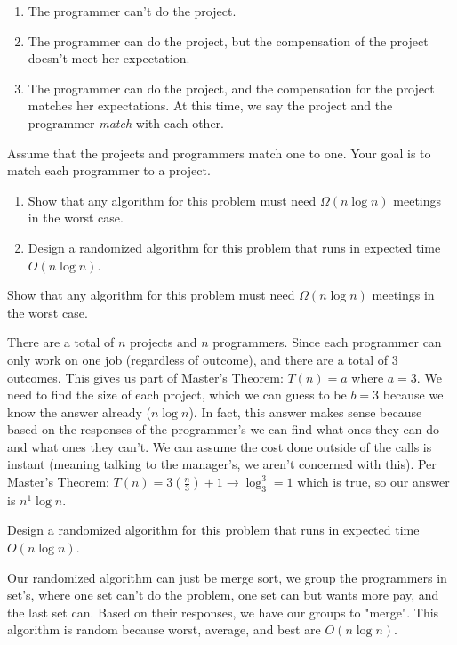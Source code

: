 \documentclass[11pt]{article}
\begin{document}
\begin{enumerate}
  \item The programmer can't do the project.
  \item The programmer can do the project, but the compensation of the
    project doesn't meet her expectation.
  \item The programmer can do the project, and the compensation for
    the project matches her expectations. At this time, we say the
    project and the programmer \textit{match} with each other.
\end{enumerate}

Assume that the projects and programmers match one to one. Your goal
is to match each programmer to a project.

\begin{enumerate}[label=\Alph*.]
\item Show that any algorithm for this problem must need $\Omega( n
\log{n} )$ meetings in the worst case.

\item  Design a randomized algorithm for this problem that runs in
expected time $O ( n \log{n} )$.
\end{enumerate}

Show that any algorithm for this problem must need $\Omega( n
\log{n} )$ meetings in the worst case.

There are a total of $n$ projects and $n$ programmers. Since each programmer can only work on one job (regardless of outcome), and there are a total of $3$ outcomes. This gives us part of Master's Theorem: $T(n) = a$ where $a = 3$. We need to find the size of each project, which we can guess to be $b = 3$ because we know the answer already ($n \log n$). In fact, this answer makes sense because based on the responses of the programmer's we can find what ones they can do and what ones they can't. We can assume the cost done outside of the calls is instant (meaning talking to the manager's, we aren't concerned with this). Per Master's Theorem: $T(n) = 3(\frac{n}{3}) + 1 \to \log_3^3 = 1$ which is true, so our answer is $n^1 \log n$.

Design a randomized algorithm for this problem that runs in
expected time $O ( n \log{n} )$.

Our randomized algorithm can just be merge sort, we group the programmers in set's, where one set can't do the problem, one set can but wants more pay, and the last set can. Based on their responses, we have our groups to "merge". This algorithm is random because worst, average, and best are $O(n \log n)$.
\end{document}
